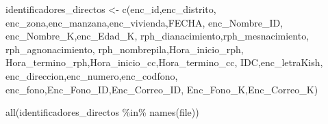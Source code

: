 \documentclass[
]{book}
\newenvironment{Shaded}{\begin{snugshade}}{\end{snugshade}}
\newcommand{\FunctionTok}[1]{\textcolor[rgb]{0.00,0.00,0.00}{#1}}
\newcommand{\NormalTok}[1]{#1}
\newcommand{\OtherTok}[1]{\textcolor[rgb]{0.56,0.35,0.01}{#1}}
\newcommand{\SpecialCharTok}[1]{\textcolor[rgb]{0.00,0.00,0.00}{#1}}
\newcommand{\StringTok}[1]{\textcolor[rgb]{0.31,0.60,0.02}{#1}}
\theoremstyle{definition}
\theoremstyle{definition}
\theoremstyle{definition}
\theoremstyle{definition}
\theoremstyle{remark}
\begin{document}
\begin{Shaded}
\begin{Highlighting}[]
\NormalTok{identificadores\_directos }\OtherTok{\textless{}{-}} \FunctionTok{c}\NormalTok{(}\StringTok{\textquotesingle{}enc\_id\textquotesingle{}}\NormalTok{,}\StringTok{\textquotesingle{}enc\_distrito\textquotesingle{}}\NormalTok{,}
                              \StringTok{\textquotesingle{}enc\_zona\textquotesingle{}}\NormalTok{,}\StringTok{\textquotesingle{}enc\_manzana\textquotesingle{}}\NormalTok{,}\StringTok{\textquotesingle{}enc\_vivienda\textquotesingle{}}\NormalTok{,}\StringTok{\textquotesingle{}FECHA\textquotesingle{}}\NormalTok{,}
                              \StringTok{\textquotesingle{}enc\_Nombre\_ID\textquotesingle{}}\NormalTok{,}
                              \StringTok{\textquotesingle{}enc\_Nombre\_K\textquotesingle{}}\NormalTok{,}\StringTok{\textquotesingle{}enc\_Edad\_K\textquotesingle{}}\NormalTok{,}
                              \StringTok{\textquotesingle{}rph\_dianacimiento\textquotesingle{}}\NormalTok{,}\StringTok{\textquotesingle{}rph\_mesnacimiento\textquotesingle{}}\NormalTok{,}
                              \StringTok{\textquotesingle{}rph\_agnonacimiento\textquotesingle{}}\NormalTok{,}
                              \StringTok{\textquotesingle{}rph\_nombrepila\textquotesingle{}}\NormalTok{,}\StringTok{\textquotesingle{}Hora\_inicio\_rph\textquotesingle{}}\NormalTok{,}
                              \StringTok{\textquotesingle{}Hora\_termino\_rph\textquotesingle{}}\NormalTok{,}\StringTok{\textquotesingle{}Hora\_inicio\_cc\textquotesingle{}}\NormalTok{,}\StringTok{\textquotesingle{}Hora\_termino\_cc\textquotesingle{}}\NormalTok{,}
                              \StringTok{\textquotesingle{}IDC\textquotesingle{}}\NormalTok{,}\StringTok{\textquotesingle{}enc\_letraKish\textquotesingle{}}\NormalTok{,}
                              \StringTok{\textquotesingle{}enc\_direccion\textquotesingle{}}\NormalTok{,}\StringTok{\textquotesingle{}enc\_numero\textquotesingle{}}\NormalTok{,}\StringTok{\textquotesingle{}enc\_codfono\textquotesingle{}}\NormalTok{,}
                              \StringTok{\textquotesingle{}enc\_fono\textquotesingle{}}\NormalTok{,}\StringTok{\textquotesingle{}Enc\_Fono\_ID\textquotesingle{}}\NormalTok{,}\StringTok{\textquotesingle{}Enc\_Correo\_ID\textquotesingle{}}\NormalTok{,}
                              \StringTok{\textquotesingle{}Enc\_Fono\_K\textquotesingle{}}\NormalTok{,}\StringTok{\textquotesingle{}Enc\_Correo\_K\textquotesingle{}}\NormalTok{)}

\FunctionTok{all}\NormalTok{(identificadores\_directos }\SpecialCharTok{\%in\%} \FunctionTok{names}\NormalTok{(file))}
\end{Highlighting}
\end{Shaded}
\end{document}
